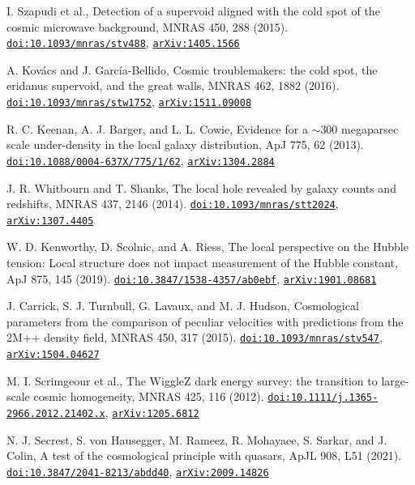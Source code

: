 \documentclass[11pt,a4paper]{article}
\begin{document}
\begin{description}[leftmargin=2.6em,labelwidth=2.2em,labelsep=0.4em,itemsep=1pt,parsep=0pt,font=\normalfont]
\item[{[8]}] I. Szapudi et al., Detection of a supervoid aligned with the cold spot of the cosmic microwave background, MNRAS 450, 288 (2015). \href{https://doi.org/10.1093/mnras/stv488}{\nolinkurl{doi:10.1093/mnras/stv488}}, \href{https://arxiv.org/abs/1405.1566}{\nolinkurl{arXiv:1405.1566}}
\item[{[9]}] A. Kovács and J. García-Bellido, Cosmic troublemakers: the cold spot, the eridanus supervoid, and the great walls, MNRAS 462, 1882 (2016). \href{https://doi.org/10.1093/mnras/stw1752}{\nolinkurl{doi:10.1093/mnras/stw1752}}, \href{https://arxiv.org/abs/1511.09008}{\nolinkurl{arXiv:1511.09008}}
\item[{[10]}] R. C. Keenan, A. J. Barger, and L. L. Cowie, Evidence for a $\sim$300 megaparsec scale under-density in the local galaxy distribution, ApJ 775, 62 (2013). \href{https://doi.org/10.1088/0004-637X/775/1/62}{\nolinkurl{doi:10.1088/0004-637X/775/1/62}}, \href{https://arxiv.org/abs/1304.2884}{\nolinkurl{arXiv:1304.2884}}
\item[{[11]}] J. R. Whitbourn and T. Shanks, The local hole revealed by galaxy counts and redshifts, MNRAS 437, 2146 (2014). \href{https://doi.org/10.1093/mnras/stt2024}{\nolinkurl{doi:10.1093/mnras/stt2024}}, \href{https://arxiv.org/abs/1307.4405}{\nolinkurl{arXiv:1307.4405}}
\item[{[12]}] W. D. Kenworthy, D. Scolnic, and A. Riess, The local perspective on the Hubble tension: Local structure does not impact measurement of the Hubble constant, ApJ 875, 145 (2019). \href{https://doi.org/10.3847/1538-4357/ab0ebf}{\nolinkurl{doi:10.3847/1538-4357/ab0ebf}}, \href{https://arxiv.org/abs/1901.08681}{\nolinkurl{arXiv:1901.08681}}
\item[{[13]}] J. Carrick, S. J. Turnbull, G. Lavaux, and M. J. Hudson, Cosmological parameters from the comparison of peculiar velocities with predictions from the 2M++ density field, MNRAS 450, 317 (2015). \href{https://doi.org/10.1093/mnras/stv547}{\nolinkurl{doi:10.1093/mnras/stv547}}, \href{https://arxiv.org/abs/1504.04627}{\nolinkurl{arXiv:1504.04627}}
\item[{[14]}] M. I. Scrimgeour et al., The WiggleZ dark energy survey: the transition to large-scale cosmic homogeneity, MNRAS 425, 116 (2012). \href{https://doi.org/10.1111/j.1365-2966.2012.21402.x}{\nolinkurl{doi:10.1111/j.1365-2966.2012.21402.x}}, \href{https://arxiv.org/abs/1205.6812}{\nolinkurl{arXiv:1205.6812}}
\item[{[15]}] N. J. Secrest, S. von Hausegger, M. Rameez, R. Mohayaee, S. Sarkar, and J. Colin, A test of the cosmological principle with quasars, ApJL 908, L51 (2021). \href{https://doi.org/10.3847/2041-8213/abdd40}{\nolinkurl{doi:10.3847/2041-8213/abdd40}}, \href{https://arxiv.org/abs/2009.14826}{\nolinkurl{arXiv:2009.14826}}

\end{description}
\end{document}
